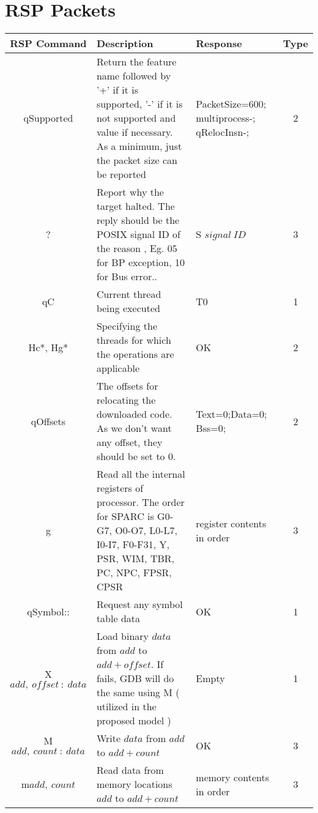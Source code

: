 
\appendix
\chapter{RSP Packets}
\label{appRSP} %

\begin{longtable}{c |m{6.5cm} |m{3.5cm} |c}
\hline
\hline
\textbf{RSP Command} & \centering \textbf{Description} &  \centering \textbf{Response} & \textbf{Type}\\
\hline
\hline

qSupported  & Return the feature name followed by '+' if it is supported, '-' if it is not supported and value if necessary. As a minimum, just the packet size can be reported & PacketSize=600; multiprocess-; qRelocInsn-; & 2\\
\hline

? & Report why the target halted. The reply should be the POSIX signal ID of the reason , Eg. 05 for BP exception, 10 for Bus error.. & S $signal\:ID$ & 3\\
\hline

qC & Current thread being executed & T0 & 1\\
\hline

Hc*, Hg* & Specifying the threads for which the operations are applicable & OK & 2\\
\hline

qOffsets & The offsets for relocating the downloaded code. As we don't want any offset, they should be set to 0. & Text=0;Data=0; Bss=0; & 2\\
\hline

g & Read all the internal registers of processor. The order for SPARC is G0-G7, O0-O7, L0-L7, I0-I7, F0-F31, Y, PSR, WIM, TBR, PC, NPC, FPSR, CPSR & register contents in order & 3\\
\hline

qSymbol:: & Request any symbol table data & OK & 1\\
\hline

X$add,\:offset\::\:data$ & Load binary $data$ from $add$ to $add+offset$. If fails, GDB will do the same using M ( utilized in the proposed model ) & Empty & 1\\
\hline

M$add,\:count\::\:data$& Write $data$ from $add$ to $add+count$& OK & 3\\
\hline

m$add,\:count$& Read data from memory locations $add$ to $add+count$& memory contents in order & 3\\
\hline


\end{longtable}
